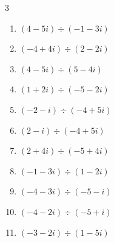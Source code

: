 \begin{multicols}{3}
\begin{enumerate}
  \item $\displaystyle (4-5i)\div(-1-3i)$


\columnbreak %

\resetques

  \item $\displaystyle (-4+4i)\div(2-2i)$

        \phantom{$\displaystyle =-2$}

  \item $\displaystyle (4-5i)\div(5-4i)$


  \item $\displaystyle (1+2i)\div(-5-2i)$


  \item $\displaystyle (-2-i)\div(-4+5i)$


  \item $\displaystyle (2-i)\div(-4+5i)$


  \item $\displaystyle (2+4i)\div(-5+4i)$


  \item $\displaystyle (-1-3i)\div(1-2i)$

        \phantom{$\displaystyle =1-i$}

  \item $\displaystyle (-4-3i)\div(-5-i)$


  \item $\displaystyle (-4-2i)\div(-5+i)$


  \item $\displaystyle (-3-2i)\div(1-5i)$


\columnbreak %


\end{enumerate}
\end{multicols}
